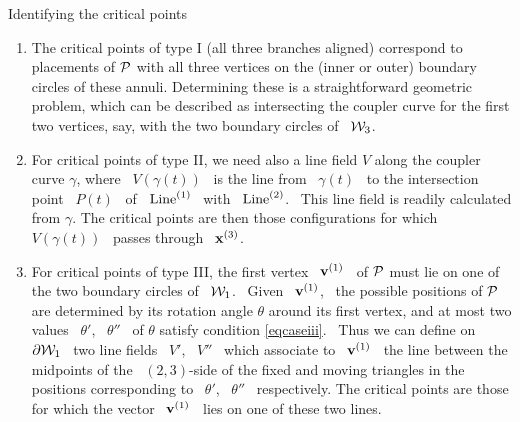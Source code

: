 \begin{mysubsect}[\label{scrit}]{Identifying the critical points}
\begin{enumerate}
\renewcommand{\labelenumi}{(\arabic{enumi})}
%
\item The critical points of type I (all three branches aligned)
correspond to placements of $\mathcal{P}$ with all three vertices on the
(inner or outer) boundary circles of these annuli. Determining these
is a straightforward geometric problem, which can be described as
intersecting the coupler curve for the first two vertices, say, with
the two boundary circles of \ $\mathcal{W}_{3}$.
%
\item For critical points of type II, we need also a line field $V$
along the coupler curve $\gamma$, where \ $V(\gamma(t))$ \ is the
line from \ $\gamma(t)$ \ to the intersection point \ $P(t)$ \
of  \ $\operatorname{Line}\sp{({1})}$ \ with \ $\operatorname{Line}\sp{({2})}$. \ This line field is
readily calculated from $\gamma$. The critical points are
then those configurations for which \ $V(\gamma(t))$ \ passes through \
$\mathbf{x}\sp{({3})}$.
%
\item For critical points of type III, the first vertex \ $\mathbf{v}\sp{({1})}$ \
of $\mathcal{P}$ must lie on one of the two boundary circles of \ $\mathcal{W}_{1}$. \
Given \ $\mathbf{v}\sp{({1})}$, \ the possible positions of $\mathcal{P}$ are determined by
its rotation angle $\theta$ around its first vertex, and at most two
values \ $\theta'$, \ $\theta''$ \ of $\theta$ satisfy condition
\eqref{eqcaseiii}. \ Thus we can define on \ $\partial \mathcal{W}_{1}$ \ two
line fields \ $V'$, \ $V''$ \  which associate to \ $\mathbf{v}\sp{({1})}$ \ the
line between the midpoints of the \ $(2,3)$-side of the fixed and
moving triangles in the positions corresponding to  \ $\theta'$, \
$\theta''$ \ respectively. The critical points are those for which the
vector \ $\mathbf{v}\sp{({1})}$ \ lies on one of these two lines\vsm.
%
\end{enumerate}
%
\end{mysubsect}

